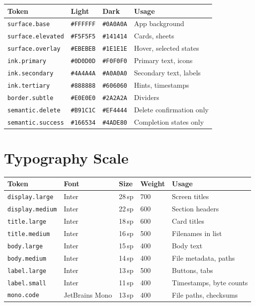 \begin{longtable}{@{}p{38mm}p{28mm}p{22mm}p{50mm}@{}}
\toprule
\textbf{Token} & \textbf{Light} & \textbf{Dark} & \textbf{Usage} \\
\midrule
\texttt{surface.base} & \texttt{\#FFFFFF} & \texttt{\#0A0A0A} & App background \\
\texttt{surface.elevated} & \texttt{\#F5F5F5} & \texttt{\#141414} & Cards, sheets \\
\texttt{surface.overlay} & \texttt{\#EBEBEB} & \texttt{\#1E1E1E} & Hover, selected states \\
\texttt{ink.primary} & \texttt{\#0D0D0D} & \texttt{\#F0F0F0} & Primary text, icons \\
\texttt{ink.secondary} & \texttt{\#4A4A4A} & \texttt{\#A0A0A0} & Secondary text, labels \\
\texttt{ink.tertiary} & \texttt{\#888888} & \texttt{\#606060} & Hints, timestamps \\
\texttt{border.subtle} & \texttt{\#E0E0E0} & \texttt{\#2A2A2A} & Dividers \\
\texttt{semantic.delete} & \texttt{\#B91C1C} & \texttt{\#EF4444} & Delete confirmation only \\
\texttt{semantic.success} & \texttt{\#166534} & \texttt{\#4ADE80} & Completion states only \\
\bottomrule
\end{longtable}

\section{Typography Scale}

\begin{longtable}{@{}p{36mm}p{22mm}p{18mm}p{18mm}p{44mm}@{}}
\toprule
\textbf{Token} & \textbf{Font} & \textbf{Size} & \textbf{Weight} & \textbf{Usage} \\
\midrule
\texttt{display.large} & Inter & 28\,sp & 700 & Screen titles \\
\texttt{display.medium} & Inter & 22\,sp & 600 & Section headers \\
\texttt{title.large} & Inter & 18\,sp & 600 & Card titles \\
\texttt{title.medium} & Inter & 16\,sp & 500 & Filenames in list \\
\texttt{body.large} & Inter & 15\,sp & 400 & Body text \\
\texttt{body.medium} & Inter & 14\,sp & 400 & File metadata, paths \\
\texttt{label.large} & Inter & 13\,sp & 500 & Buttons, tabs \\
\texttt{label.small} & Inter & 11\,sp & 400 & Timestamps, byte counts \\
\texttt{mono.code} & JetBrains Mono & 13\,sp & 400 & File paths, checksums \\
\bottomrule
\end{longtable}

